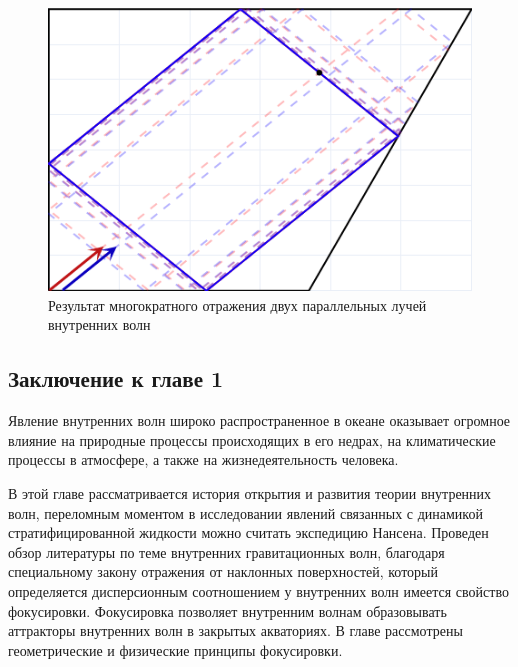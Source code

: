 \begin{figure}
    \centering
    \includegraphics[scale=0.8]{Figs/RayTracing.png}
    \caption{Результат многократного отражения двух параллельных лучей внутренних волн}
    \label{fig:RayTr}
\end{figure}



\subsection*{Заключение к главе 1}

Явление внутренних волн широко распространенное в океане оказывает огромное влияние на природные процессы происходящих в его недрах, на климатические процессы в атмосфере, а также на жизнедеятельность человека. 

В этой главе рассматривается история открытия и развития теории внутренних волн, переломным моментом в исследовании явлений связанных с динамикой стратифицированной жидкости можно считать экспедицию Нансена. Проведен обзор литературы по теме внутренних гравитационных волн, благодаря специальному закону отражения от наклонных поверхностей, который определяется дисперсионным соотношением у внутренних волн имеется свойство фокусировки. Фокусировка позволяет внутренним волнам образовывать аттракторы внутренних волн в закрытых акваториях. В главе рассмотрены геометрические и физические принципы фокусировки. 